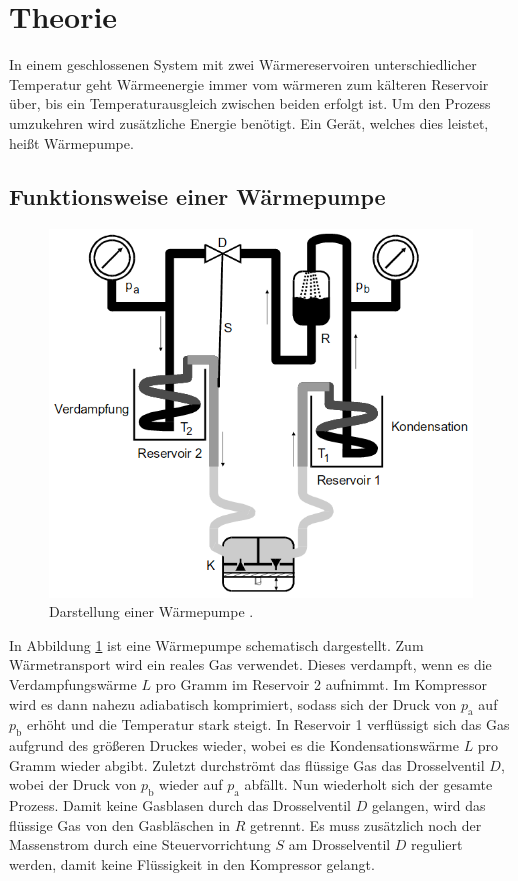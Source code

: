 
\section{Theorie}
\label{sec:Theorie}
In einem geschlossenen System mit zwei Wärmereservoiren unterschiedlicher Temperatur geht
  Wärmeenergie immer vom wärmeren zum kälteren Reservoir über, bis ein
  Temperaturausgleich zwischen beiden erfolgt ist. Um den Prozess
  umzukehren wird zusätzliche Energie benötigt. Ein Gerät, welches dies leistet,
  heißt Wärmepumpe.
 \subsection{Funktionsweise einer Wärmepumpe}
  \begin{figure}
  	\centering
  	\includegraphics[width=\linewidth-100pt,height=\textheight-100pt,keepaspectratio]{content/Bilder/Aufbau.png}
  	\caption{Darstellung einer Wärmepumpe \cite{V206}.}
  	\label{fig:Aufbau1}
  \end{figure}
In Abbildung \ref{fig:Aufbau1} ist eine Wärmepumpe schematisch dargestellt.
Zum Wärmetransport wird ein reales Gas verwendet. Dieses verdampft,
wenn es die Verdampfungswärme $L$ pro Gramm im Reservoir 2 aufnimmt. Im Kompressor wird es dann nahezu adiabatisch komprimiert, sodass sich der Druck von $p_\text{a}$ auf $p_\text{b}$ erhöht und die Temperatur stark steigt. In Reservoir 1 verflüssigt sich das Gas aufgrund des größeren Druckes wieder, wobei es die Kondensationswärme $L$ pro Gramm wieder abgibt. Zuletzt durchströmt das flüssige Gas das Drosselventil $D$, wobei der Druck von $p_\text{b}$ wieder auf $p_\text{a}$ abfällt. Nun wiederholt sich der gesamte Prozess. Damit keine Gasblasen durch das Drosselventil $D$ gelangen, wird das flüssige Gas von den Gasbläschen in $R$ getrennt. Es muss zusätzlich noch der Massenstrom durch eine Steuervorrichtung $S$ am Drosselventil $D$ reguliert werden, damit keine Flüssigkeit in den Kompressor gelangt. 

